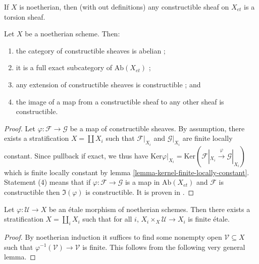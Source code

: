 \begin{remark}
\label{remark-noetherian-constructible-torsion}
If $X$ is noetherian, then (with out definitions)
any constructible sheaf on $X_{et}$ is a torsion sheaf.
\end{remark}

\begin{lemma}
\label{lemma-constructible-abelian}
Let $X$ be a noetherian scheme. Then:
\begin{enumerate}
\item the category of constructible sheaves is abelian ;
\item it is a full exact subcategory of $\text{Ab}(X_{et})$ ;
\item any extension of constructible sheaves is constructible ; and
\item the image of a map from a constructible sheaf to any other sheaf
is constructible.
\end{enumerate}
\end{lemma}

\begin{proof}
Let $\varphi: \mathcal{F} \to \mathcal{G}$ be a map of constructible sheaves.
By assumption, there exists a stratification $X = \coprod X_i$ such that
$\mathcal{F}|_{X_i}$ and $\mathcal{G}|_{X_i}$ are finite locally constant.
Since pullback if exact, we thus have $\text{Ker} \varphi|_{X_i} = \text{Ker}
(\mathcal{F}|_{X_i}\xrightarrow{\varphi} \mathcal{G}|_{X_i})$ which is finite
locally constant by lemma \ref{lemma-kernel-finite-locally-constant}.
Statement (4) means that if $\varphi :\mathcal{F}\to\mathcal{G}$ is a map in
$\text{Ab}(X_{et})$ and $\mathcal{F}$ is constructible then $\Im(\varphi)$ is
constructible. It is proven in \cite{SGA4.5}.
\end{proof}

\begin{lemma}
\label{lemma-etale-stratified-finite}
Let $\varphi: \mathcal{U} \to X$ be an \'etale morphism of noetherian schemes.
Then there exists a stratification $X=\coprod_i X_i$ such that for all $i$,
$X_i\times_X \mathcal{U} \to X_i$ is finite \'etale.
\end{lemma}

\begin{proof}
By noetherian induction it suffices to find some nonempty open
$\mathcal{V}\subseteq X$ such that $\varphi^{-1}(\mathcal{V})\to \mathcal{V}$
is finite. This follows from the following very general lemma.
\end{proof}

